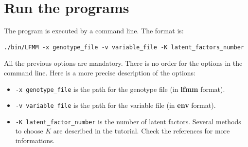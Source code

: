 \documentclass[10pt,a4paper]{article}
\begin{document}
\section{Run the programs}
The program is executed by a command line. The format is:
\begin{Verbatim}[frame=single]
./bin/LFMM -x genotype_file -v variable_file -K latent_factors_number 
\end{Verbatim}

\noindent
All the previous options are mandatory. There is no order for the options in the command line. 
Here is a more precise description of the options:
\begin{itemize}
\item \verb|-x genotype_file| is the path for the genotype file (in {\bf lfmm} format).
\item \verb|-v variable_file| is the path for the variable file (in {\bf env} format).
\item \verb|-K latent_factor_number| is the number of latent factors. Several methods to choose $K$ are described in the tutorial. Check the references for more informations.
\end{itemize}
\end{document}
